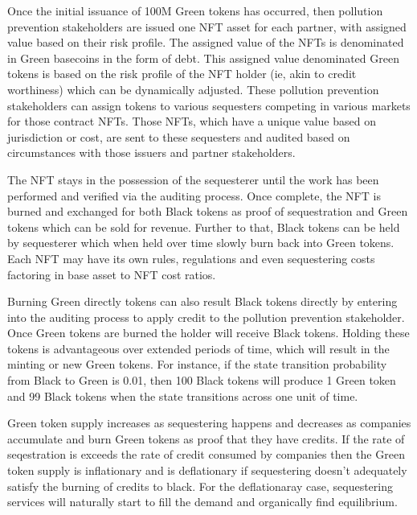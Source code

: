 \documentclass{article}
\begin{document}
Once the initial issuance of 100M Green tokens has occurred, then pollution prevention stakeholders are issued one NFT asset for each partner, with assigned value based on their risk profile. The assigned value of the NFTs is denominated in Green basecoins in the form of debt. This assigned value denominated Green tokens is based on the risk profile of the NFT holder (ie, akin to credit worthiness) which can be dynamically adjusted. These  pollution prevention stakeholders can assign tokens to various sequesters competing in various markets for those contract NFTs. Those NFTs, which have a unique value based on jurisdiction or cost, are sent to these sequesters and audited based on circumstances with those issuers and partner stakeholders.

The NFT stays in the possession of the sequesterer until the work has been performed and verified via the auditing process. Once complete, the NFT is burned and exchanged for both Black tokens as proof of sequestration and Green tokens which can be sold for revenue. Further to that, Black tokens can be held by sequesterer which when held over time slowly burn back into Green tokens. Each NFT may have its
own rules, regulations and even sequestering costs factoring in base asset to NFT cost ratios.

Burning Green directly tokens can also result Black tokens directly by entering into the auditing process to apply credit to the pollution prevention stakeholder. Once Green tokens are burned the holder will receive Black tokens. Holding these tokens is advantageous over extended periods of time, which will result in the minting or new Green tokens. For instance, if the state transition probability from Black to Green is 0.01, then 100 Black tokens will produce 1 Green token and 99 Black tokens when the state transitions across one unit of time.

Green token supply increases as sequestering happens and decreases as companies accumulate and burn Green tokens as proof that they have credits. If the rate of seqestration is exceeds the rate of credit consumed by companies then the Green token supply is inflationary and is deflationary if sequestering doesn’t adequately satisfy the burning of credits to black. For the deflationaray case, sequestering services will naturally start to fill the demand and organically find equilibrium.
\end{document}

